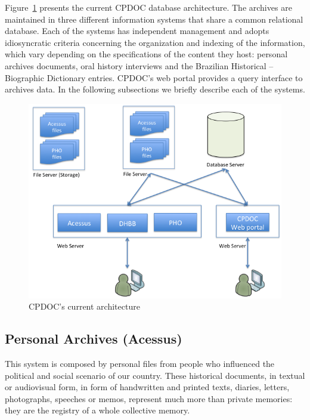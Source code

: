 Figure~\ref{fig:cpdoc-today} presents the current CPDOC database
architecture. The archives are maintained in three different
information systems that share a common relational database. 
Each of the systems has independent management and
adopts idiosyncratic criteria concerning the organization and indexing
of the information, which vary depending on the specifications of the
content they host: personal archives documents, oral history
interviews and the Brazilian Historical -- Biographic Dictionary
entries. CPDOC's web portal provides a query interface to archives data. In
the following subsections we briefly describe each of the systems.

\begin{figure}[thbp]
  \centering
  \includegraphics[width=.7\textwidth]{cur-architecture.png}
  \caption{CPDOC's current architecture}\label{fig:cpdoc-today}
\end{figure}

\subsection{Personal Archives (Acessus)}

This system is composed by personal files from people who influenced
the political and social scenario of our country. These historical
documents, in textual or audiovisual form,
in form of handwritten and printed texts, diaries, letters,
photographs, speeches or memos, represent much more than private
memories: they are the registry of a whole collective memory.

